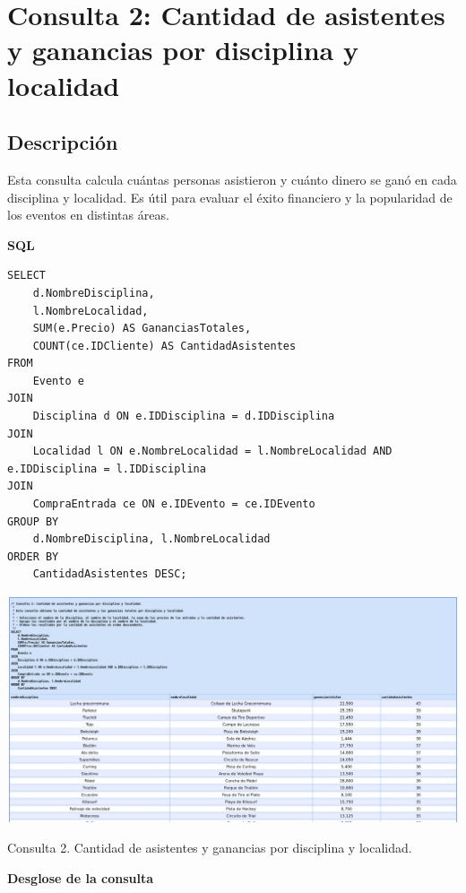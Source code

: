 \section*{Consulta 2: Cantidad de asistentes y ganancias por disciplina y localidad}

\subsection*{Descripción}
Esta consulta calcula cuántas personas asistieron y cuánto dinero se ganó en cada disciplina y localidad. Es útil para evaluar el éxito financiero y la popularidad de los eventos en distintas áreas.

\textbf{SQL}

\begin{verbatim}
SELECT 
    d.NombreDisciplina,
    l.NombreLocalidad,
    SUM(e.Precio) AS GananciasTotales,
    COUNT(ce.IDCliente) AS CantidadAsistentes
FROM 
    Evento e
JOIN 
    Disciplina d ON e.IDDisciplina = d.IDDisciplina
JOIN 
    Localidad l ON e.NombreLocalidad = l.NombreLocalidad AND e.IDDisciplina = l.IDDisciplina
JOIN 
    CompraEntrada ce ON e.IDEvento = ce.IDEvento
GROUP BY 
    d.NombreDisciplina, l.NombreLocalidad
ORDER BY 
    CantidadAsistentes DESC;
\end{verbatim}

\begin{center}
    \includegraphics[width=16.5cm]{../resources/Chapters/Consultas/Imagenes/Consulta2.jpeg} 
    
   Consulta 2. Cantidad de asistentes y ganancias por disciplina y localidad. 
\end{center}

\textbf{Desglose de la consulta}

